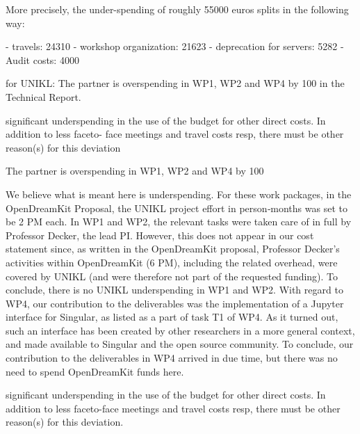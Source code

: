 More precisely, the under-spending of roughly 55000 euros splits in the following way:

- travels: 24310
- workshop organization: 21623
- deprecation for servers: 5282
- Audit costs: 4000

for UNIKL:
The partner is overspending in WP1, WP2 and WP4 by 100%
in the Technical Report.

significant underspending in the use of the budget for other direct costs. In addition to less faceto-
face meetings and travel costs resp, there must be other reason(s) for this deviation

The partner is overspending in WP1, WP2 and WP4 by 100%

We believe what is meant here is underspending. For these work packages, in the OpenDreamKit Proposal, 
the UNIKL project effort in person‑months was set to be 2 PM each. In WP1 and WP2, the relevant tasks were taken care 
of in full by Professor Decker, the lead PI. However, this does not appear in our cost statement since, as written
in the OpenDreamKit proposal,  Professor Decker’s activities within OpenDreamKit (6 PM), including the related 
overhead, were covered by UNIKL (and were therefore not part of the requested funding). To conclude, there is 
no UNIKL underspending in WP1 and WP2. With regard to WP4, our contribution to the deliverables was the 
implementation of a Jupyter interface for Singular, as listed as a part of task T1 of WP4. As it turned out, 
such an interface has been created by other researchers in a more general context, and made available to 
Singular and the open source community. To conclude, our contribution to the deliverables in WP4 arrived
in due time, but there was no need to spend OpenDreamKit funds here.

significant underspending in the use of the budget for other direct costs. In addition to less faceto-face meetings and travel costs resp, there must be other reason(s) for this deviation.

